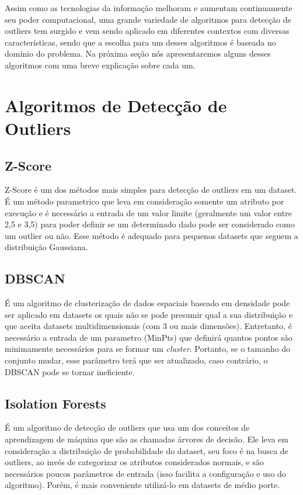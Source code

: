 Assim como as tecnologias da informação melhoram e aumentam continuamente seu poder computacional, uma grande variedade de algoritmos para detecção de outliers tem surgido e vem sendo aplicado em diferentes contextos com diversas características, sendo que a escolha para um desses algoritmos é baseada no domínio do problema. Na próxima seção nós apresentaremos alguns desses algoritmos com uma breve explicação sobre cada um.

\section{Algoritmos de Detecção de Outliers}

\subsection{Z-Score}

Z-Score \cite{doi:10.1111/j.1540-6261.1968.tb00843.x} é um dos métodos mais simples para detecção de outliers em um dataset. É um método parametrico que leva em consideração somente um atributo por execução e é necessário a entrada de um valor limite (geralmente um valor entre 2,5 e 3,5) para poder definir se um determinado dado pode ser considerado como um outlier ou não. Esse método é adequado para pequenos datasets que seguem a distribuição Gaussiana.

\subsection{DBSCAN}

É um algoritmo de clusterização de dados espaciais baseado em densidade \cite{Ester:1996:DAD:3001460.3001507} pode ser aplicado em datasets os quais não se pode presumir qual a sua distribuição e que aceita datasets multidimensionais (com 3 ou mais dimensões). Entretanto, é necessário a entrada de um parametro (MinPts) que definirá quantos pontos são minimamente necessários para se formar um \textit{cluster}. Portanto, se o tamanho do conjunto mudar, esse parâmetro terá que ser atualizado, caso contrário, o DBSCAN pode se tornar ineficiente.

\subsection{Isolation Forests}

É um algoritmo de detecção de outliers \cite{IsolationForests} que usa um dos conceitos de aprendizagem de máquina que são as chamadas árvores de decisão. Ele leva em consideração a distribuição de probabilidade do dataset, seu foco é na busca de outliers, ao invés de categorizar os atributos considerados normais, e são necessários poucos parâmetros de entrada (isso facilita a configuração e uso do algoritmo). Porém, é mais conveniente utilizá-lo em datasets de médio porte.

